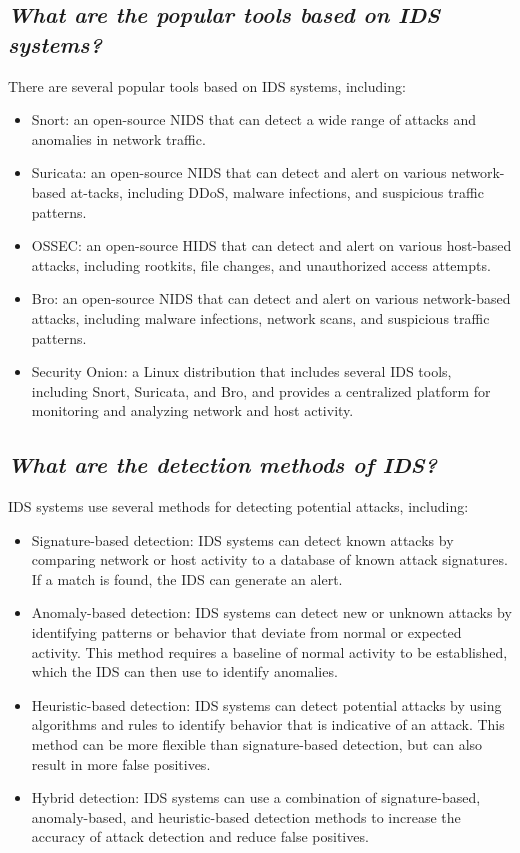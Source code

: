 \documentclass{article}
\begin{document}
\subsection{\textit{What are the popular tools based on IDS systems?}}
There are several popular tools based on IDS systems, including:
\begin{itemize}
	\item Snort: an open-source NIDS that can detect a wide range of attacks and anomalies in network traffic.
	\item Suricata: an open-source NIDS that can detect and alert on various network-based at-tacks, including DDoS, malware infections, and suspicious traffic patterns.
	\item OSSEC: an open-source HIDS that can detect and alert on various host-based attacks, including rootkits, file changes, and unauthorized access attempts.
	\item Bro: an open-source NIDS that can detect and alert on various network-based attacks, including malware infections, network scans, and suspicious traffic patterns.
	\item Security Onion: a Linux distribution that includes several IDS tools, including Snort, Suricata, and Bro, and provides a centralized platform for monitoring and analyzing network and host activity.
	
\end{itemize}
\subsection{\textit{What are the detection methods of IDS?}}
IDS systems use several methods for detecting potential attacks, including:
\begin{itemize}
	\item Signature-based detection: IDS systems can detect known attacks by comparing network or host activity to a database of known attack signatures. If a match is found, the IDS can generate an alert.
	\item Anomaly-based detection: IDS systems can detect new or unknown attacks by identifying patterns or behavior that deviate from normal or expected activity. This method requires a baseline of normal activity to be established, which the IDS can then use to identify anomalies.
	\item Heuristic-based detection: IDS systems can detect potential attacks by using algorithms and rules to identify behavior that is indicative of an attack. This method can be more flexible than signature-based detection, but can also result in more false positives.
	\item Hybrid detection: IDS systems can use a combination of signature-based, anomaly-based, and heuristic-based detection methods to increase the accuracy of attack detection and reduce false positives.
	
\end{itemize}
\end{document}

